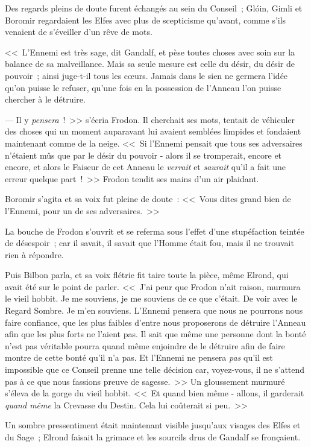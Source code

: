 Des regards pleins de doute furent échangés au sein du Conseil~; Glóin, Gimli et Boromir regardaient les Elfes avec plus de scepticisme qu'avant, comme s'ils venaient de s'éveiller d'un rêve de mots.

<<~L'Ennemi est très sage, dit Gandalf, et pèse toutes choses avec soin sur la balance de sa malveillance. Mais sa seule mesure est celle du désir, du désir de pouvoir~; ainsi juge-t-il tous les cœurs. Jamais dans le sien ne germera l'idée qu'on puisse le refuser, qu'une fois en la possession de l'Anneau l'on puisse chercher à le détruire.

--- Il y \emph{pensera}~!~>> s'écria Frodon. Il cherchait ses mots, tentait de véhiculer des choses qui un moment auparavant lui avaient semblées limpides et fondaient maintenant comme de la neige. <<~Si l'Ennemi pensait que tous ses adversaires n'étaient mûs que par le désir du pouvoir - alors il se tromperait, encore et encore, et alors le Faiseur de cet Anneau le \emph{verrait} et \emph{saurait} qu'il a fait une erreur quelque part~!~>> Frodon tendit ses mains d'un air plaidant.

Boromir s'agita et sa voix fut pleine de doute~: <<~Vous dites grand bien de l'Ennemi, pour un de ses adversaires.~>>

La bouche de Frodon s'ouvrit et se referma sous l'effet d'une stupéfaction teintée de désespoir~; car il savait, il savait que l'Homme était fou, mais il ne trouvait rien à répondre.

Puis Bilbon parla, et sa voix flétrie fit taire toute la pièce, même Elrond, qui avait été sur le point de parler. <<~J'ai peur que Frodon n'ait raison, murmura le vieil hobbit. Je me souviens, je me souviens de ce que c'était. De voir avec le Regard Sombre. Je m'en souviens. L'Ennemi pensera que nous ne pourrons nous faire confiance, que les plus faibles d'entre nous proposerons de détruire l'Anneau afin que les plus forts ne l'aient pas. Il sait que même une personne dont la bonté n'est pas véritable pourra quand même enjoindre de le détruire afin de faire montre de cette bonté qu'il n'a pas. Et l'Ennemi ne pensera \emph{pas} qu'il est impossible que ce Conseil prenne une telle décision car, voyez-vous, il ne s'attend pas à ce que nous fassions preuve de sagesse.~>> Un gloussement murmuré s'éleva de la gorge du vieil hobbit. <<~Et quand bien même - allons, il garderait \emph{quand même} la Crevasse du Destin. Cela lui coûterait si peu.~>>

Un sombre pressentiment était maintenant visible jusqu'aux visages des Elfes et du Sage~; Elrond faisait la grimace et les sourcils drus de Gandalf se fronçaient.

